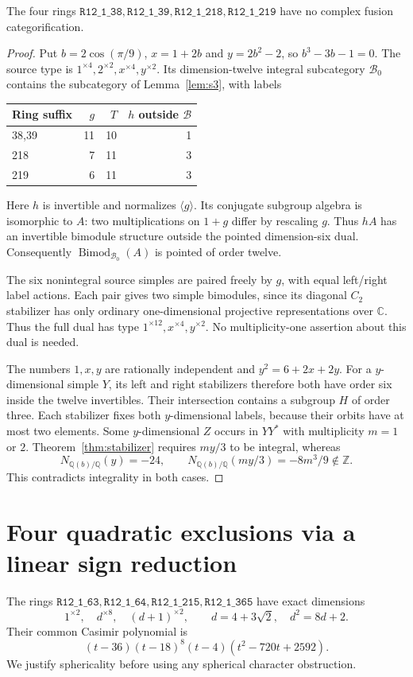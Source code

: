 \documentclass[11pt]{article}
\newcommand{\ring}[1]{\texttt{R12\_1\_#1}}
\begin{document}
\begin{proposition}
The four rings $\ring{38},\ring{39},\ring{218},\ring{219}$ have no complex
fusion categorification.
\end{proposition}
\begin{proof}
Put $b=2\cos(\pi/9)$, $x=1+2b$ and $y=2b^2-2$, so $b^3-3b-1=0$.
The source type is $1^{\times4},2^{\times2},x^{\times4},y^{\times2}$.
Its dimension-twelve integral subcategory $\mathcal B_0$ contains the subcategory
of Lemma~\ref{lem:s3}, with labels
\begin{center}\begin{tabular}{lrrr}\toprule Ring suffix&$g$&$T$&$h$ outside $\mathcal B$\\\midrule
38,39&11&10&1\\218&7&11&3\\219&6&11&3\\\bottomrule\end{tabular}\end{center}
Here $h$ is invertible and normalizes $\langle g\rangle$. Its conjugate subgroup
algebra is isomorphic to $A$: two multiplications on $1+g$ differ by rescaling $g$.
Thus $hA$ has an invertible bimodule structure outside the pointed dimension-six
dual. Consequently $\operatorname{Bimod}_{\mathcal B_0}(A)$ is pointed of order twelve.

The six nonintegral source simples are paired freely by $g$, with equal left/right
label actions. Each pair gives two simple bimodules, since its diagonal $C_2$
stabilizer has only ordinary one-dimensional projective representations over
$\mathbb C$. Thus the full dual has type $1^{\times12},x^{\times4},y^{\times2}$.
No multiplicity-one assertion about this dual is needed.

The numbers $1,x,y$ are rationally independent and $y^2=6+2x+2y$. For a
$y$-dimensional simple $Y$, its left and right stabilizers therefore both have
order six inside the twelve invertibles. Their intersection contains a subgroup
$H$ of order three. Each stabilizer fixes both $y$-dimensional labels, because
their orbits have at most two elements. Some $y$-dimensional $Z$ occurs in $YY^*$
with multiplicity $m=1$ or $2$. Theorem~\ref{thm:stabilizer} requires $my/3$ to be
integral, whereas
\[
 N_{\mathbb Q(b)/\mathbb Q}(y)=-24,\qquad
 N_{\mathbb Q(b)/\mathbb Q}(my/3)=-8m^3/9\notin\mathbb Z.
\]
This contradicts integrality in both cases.
\end{proof}

\section{Four quadratic exclusions via a linear sign reduction}
The rings $\ring{63},\ring{64},\ring{215},\ring{365}$ have exact dimensions
\[
 1^{\times2},\quad d^{\times8},\quad(d+1)^{\times2},\qquad
 d=4+3\sqrt2,\quad d^2=8d+2.
\]
Their common Casimir polynomial is
\[
 (t-36)(t-18)^8(t-4)(t^2-720t+2592).
\]
We justify sphericality before using any spherical character obstruction.
\end{document}
